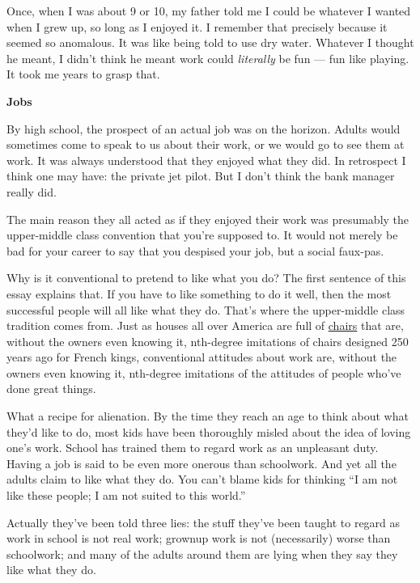 Once, when I was about 9 or 10, my father told me I could be whatever I
wanted when I grew up, so long as I enjoyed it. I remember that
precisely because it seemed so anomalous. It was like being told to use
dry water. Whatever I thought he meant, I didn't think he meant work
could \emph{literally} be fun --- fun like playing. It took me years to
grasp that.

\textbf{Jobs}

By high school, the prospect of an actual job was on the horizon. Adults
would sometimes come to speak to us about their work, or we would go to
see them at work. It was always understood that they enjoyed what they
did. In retrospect I think one may have: the private jet pilot. But I
don't think the bank manager really did.

The main reason they all acted as if they enjoyed their work was
presumably the upper-middle class convention that you're supposed to. It
would not merely be bad for your career to say that you despised your
job, but a social faux-pas.

Why is it conventional to pretend to like what you do? The first
sentence of this essay explains that. If you have to like something to
do it well, then the most successful people will all like what they do.
That's where the upper-middle class tradition comes from. Just as houses
all over America are full of
\href{http://images.google.com/images?q=louis\%20xv\%20chair}{chairs}
that are, without the owners even knowing it, nth-degree imitations of
chairs designed 250 years ago for French kings, conventional attitudes
about work are, without the owners even knowing it, nth-degree
imitations of the attitudes of people who've done great things.

What a recipe for alienation. By the time they reach an age to think
about what they'd like to do, most kids have been thoroughly misled
about the idea of loving one's work. School has trained them to regard
work as an unpleasant duty. Having a job is said to be even more onerous
than schoolwork. And yet all the adults claim to like what they do. You
can't blame kids for thinking ``I am not like these people; I am not
suited to this world.''

Actually they've been told three lies: the stuff they've been taught to
regard as work in school is not real work; grownup work is not
(necessarily) worse than schoolwork; and many of the adults around them
are lying when they say they like what they do.

